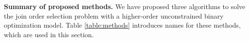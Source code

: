 \textbf{Summary of proposed methods.} We have proposed three algorithms to solve the join order selection problem with a higher-order unconstrained binary optimization model. Table \ref{table:methods} introduces names for these methods, which are used in this section.

\begin{table}[!ht]
\centering
{}
\caption{Summary of proposed algorithms}
\label{table:methods}
\end{table}



